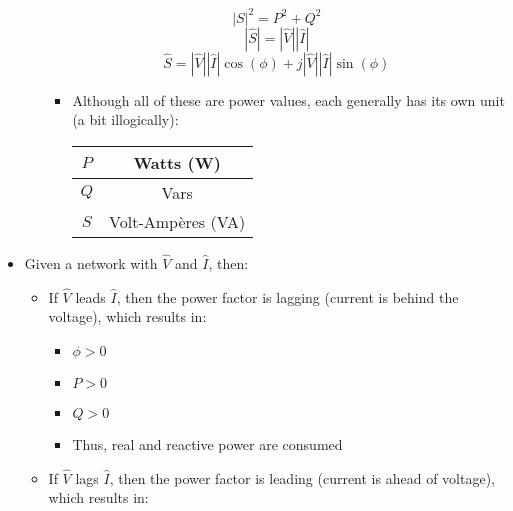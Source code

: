 \begin{itemize}
\begin{itemize}
        $$|S|^2=P^2+Q^2$$
        $$|\hat{S}|=|\hat{V}||\hat{I}|$$
        $$\hat{S}=|\hat{V}||\hat{I}|\cos(\phi)+j|\hat{V}||\hat{I}|\sin(\phi)$$

        \begin{itemize}

          \item Although all of these are power values, each generally has its own unit (a bit illogically):

            \begin{center}
              \begin{tabular}[H]{|c|c|}
                \hline
                $P$ & Watts (W)\\
                \hline
                $Q$ & Vars\\
                \hline
                $S$ & Volt-Amp\`eres (VA)\\
                \hline
              \end{tabular}
            \end{center}

        \end{itemize}

    \end{itemize}

  \item Given a network with $\hat{V}$ and $\hat{I}$, then:

    \begin{itemize}

      \item If $\hat{V}$ leads $\hat{I}$, then the power factor is lagging (current is behind the voltage), which results in:

        \begin{itemize}

          \item $\phi>0$

          \item $P>0$

          \item $Q>0$

          \item Thus, real and reactive power are consumed

        \end{itemize}

      \item If $\hat{V}$ lags $\hat{I}$, then the power factor is leading (current is ahead of voltage), which results in:


\end{itemize}
\end{itemize}

